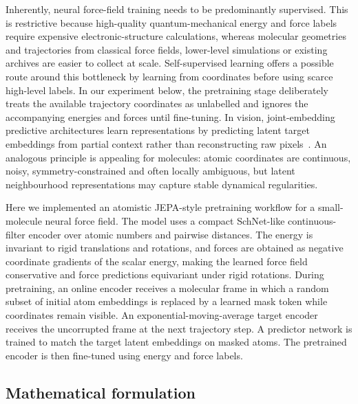 \documentclass[11pt]{article}
\begin{document}
Inherently, neural force-field training needs to be predominantly supervised. This is restrictive because high-quality quantum-mechanical energy and force labels require expensive electronic-structure calculations, whereas molecular geometries and trajectories from classical force fields, lower-level simulations or existing archives are easier to collect at scale. Self-supervised learning offers a possible route around this bottleneck by learning from coordinates before using scarce high-level labels. In our experiment below, the pretraining stage deliberately treats the available trajectory coordinates as unlabelled and ignores the accompanying energies and forces until fine-tuning. In vision, joint-embedding predictive architectures learn representations by predicting latent target embeddings from partial context rather than reconstructing raw pixels~\cite{assran2023ijepa}. An analogous principle is appealing for molecules: atomic coordinates are continuous, noisy, symmetry-constrained and often locally ambiguous, but latent neighbourhood representations may capture stable dynamical regularities.

Here we implemented an atomistic JEPA-style pretraining workflow for a small-molecule neural force field. The model uses a compact SchNet-like continuous-filter encoder over atomic numbers and pairwise distances. The energy is invariant to rigid translations and rotations, and forces are obtained as negative coordinate gradients of the scalar energy, making the learned force field conservative and force predictions equivariant under rigid rotations. During pretraining, an online encoder receives a molecular frame in which a random subset of initial atom embeddings is replaced by a learned mask token while coordinates remain visible. An exponential-moving-average target encoder receives the uncorrupted frame at the next trajectory step. A predictor network is trained to match the target latent embeddings on masked atoms. The pretrained encoder is then fine-tuned using energy and force labels.

\subsection*{Mathematical formulation}
\end{document}
